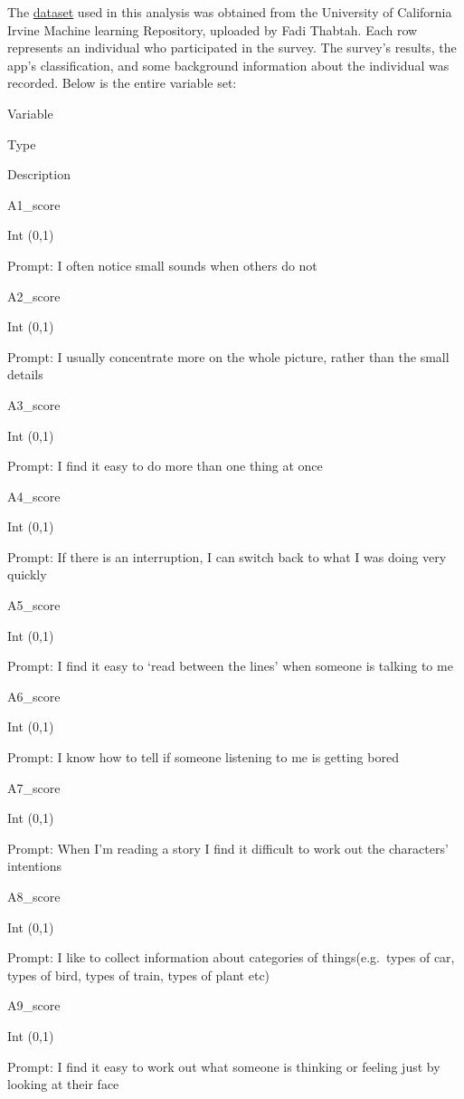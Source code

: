 \documentclass[]{article}
\begin{document}
The
\href{https://archive.ics.uci.edu/ml/datasets/Autism+Screening+Adult}{dataset}
used in this analysis was obtained from the University of California
Irvine Machine learning Repository, uploaded by Fadi Thabtah. Each row
represents an individual who participated in the survey. The survey's
results, the app's classification, and some background information about
the individual was recorded. Below is the entire variable set:

Variable

Type

Description

A1\_score

Int (0,1)

Prompt: I often notice small sounds when others do not

A2\_score

Int (0,1)

Prompt: I usually concentrate more on the whole picture, rather than the
small details

A3\_score

Int (0,1)

Prompt: I find it easy to do more than one thing at once

A4\_score

Int (0,1)

Prompt: If there is an interruption, I can switch back to what I was
doing very quickly

A5\_score

Int (0,1)

Prompt: I find it easy to `read between the lines' when someone is
talking to me

A6\_score

Int (0,1)

Prompt: I know how to tell if someone listening to me is getting bored

A7\_score

Int (0,1)

Prompt: When I'm reading a story I find it difficult to work out the
characters' intentions

A8\_score

Int (0,1)

Prompt: I like to collect information about categories of
things(e.g.~types of car, types of bird, types of train, types of plant
etc)

A9\_score

Int (0,1)

Prompt: I find it easy to work out what someone is thinking or feeling
just by looking at their face
\end{document}
